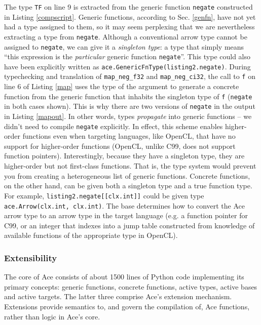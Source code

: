 The type \verb|TF| on line 9 is extracted from the generic function \verb|negate| constructed in Listing \ref{compscript}. Generic functions, according to Sec. \ref{genfn}, have not yet had a type assigned to them, so it may seem perplexing that we are nevertheless extracting a type from \verb|negate|. Although a conventional arrow type cannot be assigned to \verb|negate|, we can give it a \emph{singleton type}: a type that simply means ``this expression is the \emph{particular} generic function \verb|negate|''. This type could also have been explicitly written as \verb|ace.GenericFnType(listing2.negate)|. During typechecking and translation of \verb|map_neg_f32| and \verb|map_neg_ci32|, the call to \verb|f| on line 6 of Listing \ref{map} uses the type of the argument to generate a concrete function from the generic function that inhabits the singleton type of \verb|f| (\verb|negate| in both cases shown). This is why there are two versions of \verb|negate| in the output in Listing \ref{mapout}. In other words, types \emph{propagate} into generic functions -- we didn't need to compile \verb|negate| explicitly. In effect, this scheme enables higher-order functions even when targeting languages, like OpenCL, that have no support for higher-order functions (OpenCL, unlike C99, does not support function pointers). Interestingly, because they have a singleton type, they are higher-order but not first-class functions. That is, the type system would prevent you from creating a heterogeneous list of generic functions. Concrete functions, on the other hand, can be given both a singleton type and a true function type. For example, \verb|listing2.negate[[clx.int]]| could be given type \verb|ace.Arrow(clx.int, clx.int)|. The base determines how to convert the Ace arrow type to an arrow type in the target language (e.g. a function pointer for C99, or an integer that indexes into a jump table constructed from knowledge of available functions of the appropriate type in OpenCL).

\subsubsection{Extensibility}
The core of Ace consists of about 1500 lines of Python code implementing its primary concepts: generic functions, concrete functions, active types, active bases and active targets.  The latter three comprise Ace's extension mechanism. Extensions provide semantics to, and govern the compilation of, Ace functions, rather than logic in Ace's core. %

